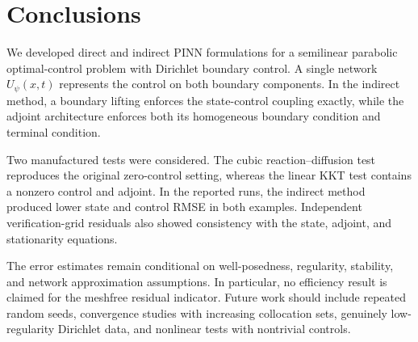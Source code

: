 \section{Conclusions}

We developed direct and indirect PINN formulations for a semilinear parabolic optimal-control problem with Dirichlet boundary control. A single network $U_\psi(x,t)$ represents the control on both boundary components. In the indirect method, a boundary lifting enforces the state-control coupling exactly, while the adjoint architecture enforces both its homogeneous boundary condition and terminal condition.

Two manufactured tests were considered. The cubic reaction--diffusion test reproduces the original zero-control setting, whereas the linear KKT test contains a nonzero control and adjoint. In the reported runs, the indirect method produced lower state and control RMSE in both examples. Independent verification-grid residuals also showed consistency with the state, adjoint, and stationarity equations.

The error estimates remain conditional on well-posedness, regularity, stability, and network approximation assumptions. In particular, no efficiency result is claimed for the meshfree residual indicator. Future work should include repeated random seeds, convergence studies with increasing collocation sets, genuinely low-regularity Dirichlet data, and nonlinear tests with nontrivial controls.

